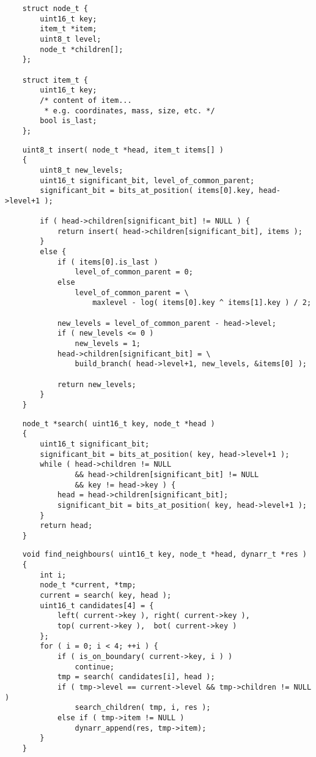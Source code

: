 \documentclass{article}
\begin{document}
\begin{verbatim}
    struct node_t {
        uint16_t key;
        item_t *item;
        uint8_t level;
        node_t *children[];
    };

    struct item_t {
        uint16_t key;
        /* content of item...
         * e.g. coordinates, mass, size, etc. */
        bool is_last;
    };
\end{verbatim}

\begin{verbatim}
    uint8_t insert( node_t *head, item_t items[] )
    {
        uint8_t new_levels;
        uint16_t significant_bit, level_of_common_parent;
        significant_bit = bits_at_position( items[0].key, head->level+1 );

        if ( head->children[significant_bit] != NULL ) {
            return insert( head->children[significant_bit], items );
        }
        else {
            if ( items[0].is_last )
                level_of_common_parent = 0;
            else
                level_of_common_parent = \
                    maxlevel - log( items[0].key ^ items[1].key ) / 2;

            new_levels = level_of_common_parent - head->level;
            if ( new_levels <= 0 )
                new_levels = 1;
            head->children[significant_bit] = \
                build_branch( head->level+1, new_levels, &items[0] );

            return new_levels;
        }
    }
\end{verbatim}

\begin{verbatim}
    node_t *search( uint16_t key, node_t *head )
    {
        uint16_t significant_bit;
        significant_bit = bits_at_position( key, head->level+1 );
        while ( head->children != NULL
                && head->children[significant_bit] != NULL
                && key != head->key ) {
            head = head->children[significant_bit];
            significant_bit = bits_at_position( key, head->level+1 );
        }
        return head;
    }
\end{verbatim}

\begin{verbatim}
    void find_neighbours( uint16_t key, node_t *head, dynarr_t *res )
    {
        int i;
        node_t *current, *tmp;
        current = search( key, head );
        uint16_t candidates[4] = {
            left( current->key ), right( current->key ),
            top( current->key ),  bot( current->key )
        };
        for ( i = 0; i < 4; ++i ) {
            if ( is_on_boundary( current->key, i ) )
                continue;
            tmp = search( candidates[i], head );
            if ( tmp->level == current->level && tmp->children != NULL )
                search_children( tmp, i, res );
            else if ( tmp->item != NULL )
                dynarr_append(res, tmp->item);
        }
    }
\end{verbatim}
\end{document}
